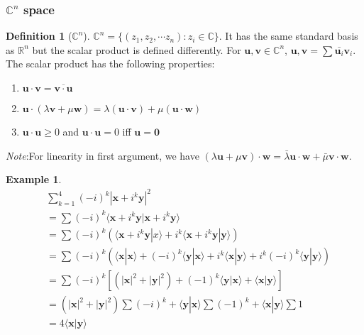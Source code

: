 \documentclass[a4paper]{article}
\theoremstyle{definition}
\newtheorem*{defi}{Definition}
\newtheorem*{eg}{Example}
\newcommand{\mb}[1]{\mathbf{#1}}
\newcommand{\note}{\noindent \emph{Note}:\;}
\newcommand{\bra}{\langle}
\newcommand{\ket}{\rangle}
\newcommand{\R}{\mathbb{R}}
\newcommand{\C}{\mathbb{C}}
\begin{document}
\subsubsection{\texorpdfstring{$\C^n$}{Cn} space}
\begin{defi}[$\C^n$]
  $\C^n = \{(z_1, z_2, \cdots z_n): z_i\in\C\}$. It has the same standard basis as $\R^n$ but the scalar product is defined differently. For $\mb{u, v}\in \C^n$, $\mb{u, v} = \sum \bar{\mb{u}_i}\mb{v}_i$. The scalar product has the following properties:
  \begin{enumerate}
  \item $\mb{u\cdot v = \overline{v\cdot u}}$
  \item $\mb{u}\cdot(\lambda\mb{v}+\mu\mb{w}) = \lambda\mb{(u\cdot v)} + \mu\mb{(u\cdot w)}$
  \item $\mb{u\cdot u} \geq 0$ and $\mb{u\cdot u} = 0$ iff $\mb{u = 0}$
  \end{enumerate}
\end{defi}
\note For linearity in first argument, we have $(\lambda\mb{u} + \mu\mb{v})\cdot\mb{w} = \bar{\lambda}\mb{u\cdot w} + \bar \mu\mb{v\cdot w}$.

\begin{eg}
  \begin{align*}
    &\sum_{k = 1}^4 (-i)^k|\mb{x} + i^k\mb{y}|^2\\
    &= \sum(-i)^k\bra\mb{x} + i^k \mb{y}|\mb{x} + i^k\mb{y}\ket\\
    &= \sum(-i)^k (\bra\mb{x} + i^k\mb{y}|x\ket + i^k\bra\mb{x} + i^k\mb{y} | \mb{y}\ket)\\
    &= \sum(-i)^k (\bra\mb{x}|\mb{x}\ket + (-i)^k\bra\mb{y}|\mb{x}\ket + i^k\bra\mb{x}|\mb{y}\ket + i^k(-i)^k\bra\mb{y}|\mb{y}\ket)\\
    &= \sum(-i)^k [(|\mb{x}|^2 + |\mb{y}|^2) + (-1)^k\bra\mb{y}|\mb{x}\ket + \bra\mb{x}|\mb{y}\ket]\\
    &= (|\mb{x}|^2 + |\mb{y}|^2)\sum(-i)^k + \bra\mb{y}|\mb{x}\ket\sum(-1)^k + \bra\mb{x}|\mb{y}\ket\sum1\\
    &= 4\bra\mb{x}|\mb{y}\ket
  \end{align*}
\end{eg}
\end{document}
